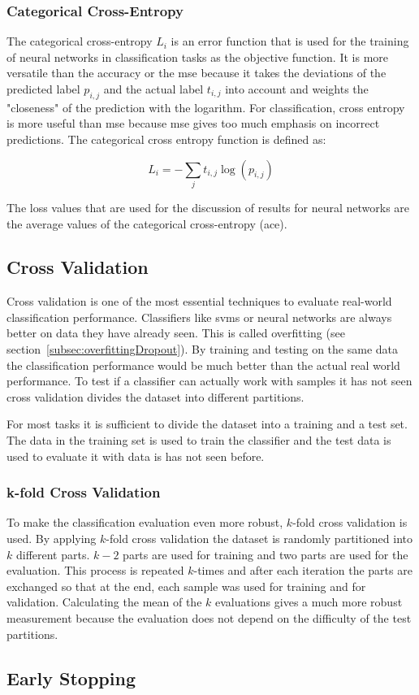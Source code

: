 \subsubsection*{Categorical Cross-Entropy}
The categorical cross-entropy $L_i$ is an error function that is used for the training of neural networks in classification tasks as the objective function. It is more versatile than the accuracy or the \gls{mse} because it takes the deviations of the predicted label $p_{i,j}$ and the actual label $t_{i,j}$ into account and weights the "closeness" of the prediction with the logarithm. For classification, cross entropy is more useful than \gls{mse} because \gls{mse} gives too much emphasis on incorrect predictions. The categorical cross entropy function is defined as:

\begin{equation}
L_i = - \sum_{j} t_{i,j}\log(p_{i,j})
\end{equation} 

The loss values that are used for the discussion of results for neural networks are the average values of the categorical cross-entropy {(\gls{ace})}.

\subsection{Cross Validation}
Cross validation is one of the most essential techniques to evaluate real-world classification performance. Classifiers like \glspl{svm} or neural networks are always better on data they have already seen. This is called overfitting {(see section~\ref{subsec:overfittingDropout})}. By training and testing on the same data the classification performance would be much better than the actual real world performance. To test if a classifier can actually work with samples it has not seen cross validation divides the dataset into different partitions. 

For most tasks it is sufficient to divide the dataset into a training and a test set. The data in the training set is used to train the classifier and the test data is used to evaluate it with data is has not seen before.

\subsubsection*{k-fold Cross Validation}
To make the classification evaluation even more robust, $k$-fold cross validation is used. By applying $k$-fold cross validation the dataset is randomly partitioned into $k$ different parts. $k-2$ parts are used for training and two parts are used for the evaluation. This process is repeated $k$-times and after each iteration the parts are exchanged so that at the end, each sample was used for training and for validation. Calculating the mean of the $k$ evaluations gives a much more robust measurement because the evaluation does not depend on the difficulty of the test partitions.

\subsection{Early Stopping}